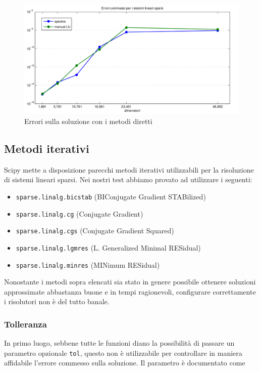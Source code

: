 \documentclass[11pt,a4paper]{scrartcl}
\begin{document}
\begin{figure}[!ht]
\centering
\includegraphics[scale=0.50]{images/errori_diretti} 
\caption{Errori sulla soluzione con i metodi diretti}
\label{errori_diretti}
\end{figure}

\subsection*{Metodi iterativi}
Scipy mette a disposizione parecchi metodi iterativi utilizzabili per la risoluzione di sistemi lineari sparsi. Nei nostri test abbiamo provato ad utilizzare i seguenti:
\begin{itemize}
	\item \texttt{sparse.linalg.bicstab} (BIConjugate Gradient STABilized)
	\item \texttt{sparse.linalg.cg} (Conjugate Gradient)
	\item \texttt{sparse.linalg.cgs} (Conjugate Gradient Squared)
	\item \texttt{sparse.linalg.lgmres} (L. Generalized Minimal RESidual)
	\item \texttt{sparse.linalg.minres} (MINimum RESidual)
\end{itemize}

Nonostante i metodi sopra elencati sia stato in genere possibile ottenere soluzioni approssimate abbastanza buone e in tempi ragionevoli, configurare correttamente i risolutori non è del tutto banale.

\subsubsection*{Tolleranza}

In primo luogo, sebbene tutte le funzioni diano la possibilità di passare un parametro opzionale \texttt{tol}, questo non è utilizzabile per controllare in maniera affidabile l'errore commesso sulla soluzione. Il parametro è documentato come
\end{document}
